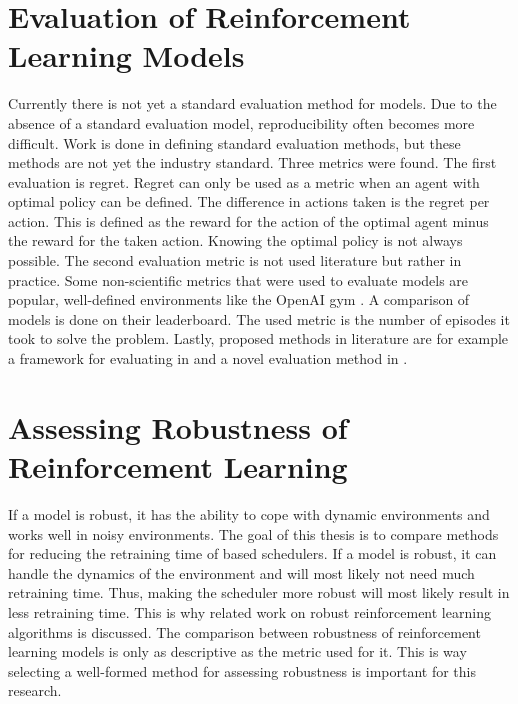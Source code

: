 

\section{Evaluation of Reinforcement Learning Models}


Currently there is not yet a standard evaluation method for \rl models. Due to
the absence of a standard evaluation model, reproducibility often becomes more
difficult. Work is done in defining standard evaluation methods, but these
methods are not yet the industry standard. Three metrics were found. The first
evaluation is regret. Regret can only be used as a metric when an agent with
optimal policy can be defined. The difference in actions taken is the regret
per action. This is defined as the reward for the action of the optimal agent
minus the reward for the taken action. Knowing the optimal policy is not
always possible. The second evaluation metric is not used literature but
rather in practice. Some non-scientific metrics that were used to evaluate \rl
models are popular, well-defined environments like the OpenAI gym
\cite{gym2016}. A comparison of \rl models is done on their
leaderboard. The used metric
is the number of episodes it took to solve the problem. Lastly, proposed
methods in literature are for example a framework for evaluating \rl in
 and a novel evaluation method in .


\section{Assessing Robustness of Reinforcement Learning}

If a \rl model is robust, it has the ability to cope with dynamic environments
and works well in noisy environments. The goal of this thesis is to compare
methods for reducing the retraining time of \rl based schedulers. If a model
is robust, it can handle the dynamics of the environment and will most likely
not need much retraining time. Thus, making the \rl scheduler more robust will
most likely result in less retraining time. This is why related work on robust
reinforcement learning algorithms is discussed. The comparison between
robustness of reinforcement learning models is only as descriptive as the
metric used for it. This is way selecting a well-formed method for assessing
robustness is important for this research.


